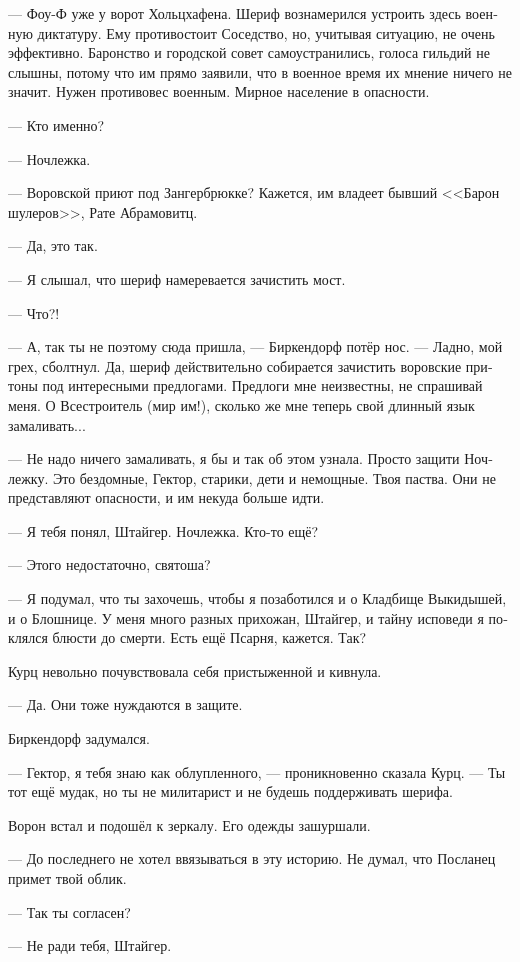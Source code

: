 \documentclass[a4paper,12pt,fleqn]{book}\usepackage{cooltooltips}\usepackage{polyglossia}\setdefaultlanguage[babelshorthands=true]{russian}\setotherlanguage{english}\defaultfontfeatures{Ligatures=TeX,Mapping=tex-text} \usepackage{xcolor}\definecolor{lightgray}{HTML}{bbbbbb}\color{lightgray}\newcommand{\ml}[3]{\textenglish{\textcolor{black}{#3}}}
\begin{document}
--- Фоу-Ф уже у ворот Хольцхафена.
Шериф вознамерился устроить здесь военную диктатуру.
Ему противостоит Соседство, но, учитывая ситуацию, не очень эффективно.
Баронство и городской совет самоустранились, голоса гильдий не слышны, потому что им прямо заявили, что в военное время их мнение ничего не значит.
Нужен противовес военным.
Мирное население в опасности.

--- Кто именно?

--- Ночлежка.

--- Воровской приют под Зангербрюкке?
Кажется, им владеет бывший <<Барон шулеров>>, Рате Абрамовитц.

--- Да, это так.

--- Я слышал, что шериф намеревается зачистить мост.

--- Что?!

--- А, так ты не поэтому сюда пришла, --- Биркендорф потёр нос.
--- Ладно, мой грех, сболтнул.
Да, шериф действительно собирается зачистить воровские притоны под интересными предлогами.
Предлоги мне неизвестны, не спрашивай меня.
О Всестроитель (мир им!), сколько же мне теперь свой длинный язык замаливать...

--- Не надо ничего замаливать, я бы и так об этом узнала.
Просто защити Ночлежку.
Это бездомные, Гектор, старики, дети и немощные.
Твоя паства.
Они не представляют опасности, и им некуда больше идти.

--- Я тебя понял, Штайгер.
Ночлежка.
Кто-то ещё?

--- Этого недостаточно, святоша?

--- Я подумал, что ты захочешь, чтобы я позаботился и о Кладбище Выкидышей, и о Блошнице.
У меня много разных прихожан, Штайгер, и тайну исповеди я поклялся блюсти до смерти.
Есть ещё Псарня, кажется.
Так?

Курц невольно почувствовала себя пристыженной и кивнула.

--- Да.
Они тоже нуждаются в защите.

Биркендорф задумался.

--- Гектор, я тебя знаю как облупленного, --- проникновенно сказала Курц.
--- Ты тот ещё мудак, но ты не милитарист и не будешь поддерживать шерифа.

Ворон встал и подошёл к зеркалу.
Его одежды зашуршали.

--- До последнего не хотел ввязываться в эту историю.
Не думал, что Посланец примет твой облик.

--- Так ты согласен?

--- Не ради тебя, Штайгер.
\end{document}
